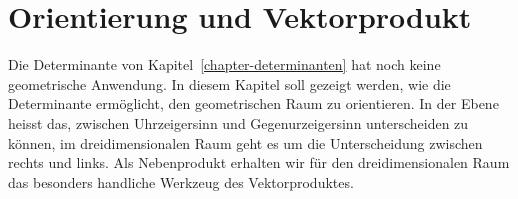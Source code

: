 %
%
%
\chapter{Orientierung und Vektorprodukt\label{chapter:orientierung}}
\rhead{}
Die Determinante von Kapitel~\ref{chapter-determinanten} hat noch
keine geometrische Anwendung.
In diesem Kapitel soll gezeigt werden, wie die Determinante ermöglicht,
den geometrischen Raum zu orientieren.
In der Ebene heisst das, zwischen Uhrzeigersinn und Gegenurzeigersinn
unterscheiden zu können, im dreidimensionalen Raum geht es um die
Unterscheidung zwischen rechts und links.
Als Nebenprodukt erhalten wir für den dreidimensionalen Raum das
besonders handliche Werkzeug des Vektorproduktes.

%





